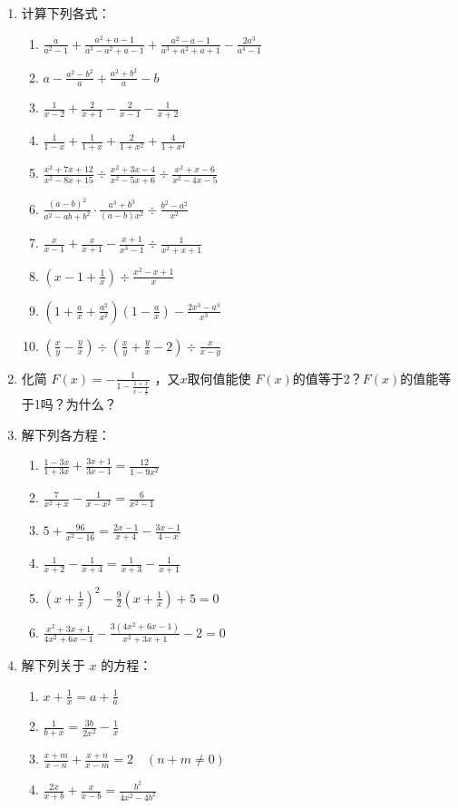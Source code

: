 \begin{enumerate}
\item 计算下列各式：
\begin{enumerate}
\item $\frac{a}{a^{2}-1}+\frac{a^{2}+ a-1}{a^{3}-a^{2}+a-1}+\frac{a^{2}-a-1}{a^{3}+a^{2}+a+1}-\frac{2 a^{3}}{a^{4}-1}$
\item  $a-\frac{a^{2}-b^{2}}{a}+\frac{a^{2}+b^{2}}{a}-b$
\item $\frac{1}{x-2}+\frac{2}{x+1}-\frac{2}{x-1}-\frac{1}{x+2}$
\item $\frac{1}{1-x}+\frac{1}{1+x}+\frac{2}{1+x^{2}}+\frac{4}{1+x^{4}}$
\item $\frac{x^{2}+7 x+12}{x^{2}-8 x+15} \div \frac{x^{2}+3 x-4}{x^{2}-5 x+6} \div \frac{x^{2}+x-6}{x^{2}-4 x-5}$
\item $\frac{(a-b)^{2}}{a^{2}-a b+b^{2}} \cdot \frac{a^{3}+b^{3}}{(a-b) x^{2}} \div \frac{b^{2}-a^{2}}{x^{2}}$
\item  $\frac{x}{x-1}+\frac{x}{x+1}-\frac{x+1}{x^{3}-1} \div \frac{1}{x^{2}+x+1}$
\item $\left(x-1+\frac{1}{x}\right)\div \frac{x^{2}-x+1}{x}$
\item $\left(1+\frac{a}{x}+\frac{a^2}{x^2}\right)\left(1-\frac{a}{x}\right)-\frac{2x^3-a^3}{x^3}$
\item $\left(\frac{x}{y}-\frac{y}{x}\right)\div \left(\frac{x}{y}+\frac{y}{x}-2\right)\div \frac{x}{x-y}$
\end{enumerate}

\item 化简 $F(x)=-\frac{1}{1-\frac{1+x}{x-\frac{1}{x}}}$
，又$x$取何值能使 $F(x)$的值等于2？$F(x)$的值能等于1吗？为什么？
\item 解下列各方程：
\begin{enumerate}
\item $\frac{1-3 x}{1+3 x}+\frac{3 x+1}{3 x-1}=\frac{12}{1-9 x^{2}}$
\item $\frac{7}{x^{2}+x}-\frac{1}{x-x^{2}}=\frac{6}{x^{2}-1}$
\item $5+\frac{96}{x^{2}-16}=\frac{2 x-1}{x+4}-\frac{3 x-1}{4-x}$
\item $\frac{1}{x+2}-\frac{1}{x+4}=\frac{1}{x+3}-\frac{1}{x+1}$
\item $\left(x+\frac{1}{x}\right)^{2}-\frac{9}{2}\left(x+\frac{1}{x}\right)+5=0$
\item $\frac{x^{2}+3 x+1}{4 x^{2}+6 x-1}-\frac{3\left(4 x^{2}+6 x-1\right)}{x^{2}+3 x+1}-2=0$
\end{enumerate}

\item 解下列关于 $x$ 的方程：
\begin{enumerate}
    \item $x+\frac{1}{x}=a+\frac{1}{a}$ 
    \item $\frac{1}{b+x}=\frac{3b}{2x^2}-\frac{1}{x}$
    \item $\frac{x+m}{x-n}+\frac{x+n}{x-m}=2\quad (n+m\ne 0)$
    \item $\frac{2x}{x+b}+\frac{x}{x-b}=\frac{b^2}{4x^2-4b^2}$
\end{enumerate}


\end{enumerate}
